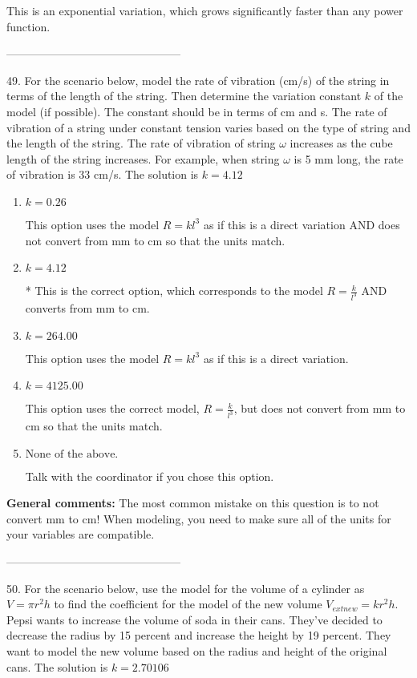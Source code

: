 \documentclass{extbook}[14pt]
\begin{document}
This is an exponential variation, which grows significantly faster than any power function.

-----------------------------------------------

49. For the scenario below, model the rate of vibration (cm/s) of the string in terms of the length of the string. Then determine the variation constant $k$ of the model (if possible). The constant should be in terms of cm and s.
The rate of vibration of a string under constant tension varies based on the type of string and the length of the string. The rate of vibration of string $\omega$ increases as the cube length of the string increases. For example, when string $\omega$ is 5 mm long, the rate of vibration is 33 cm/s. 
The solution is $ k = 4.12 $ 

\begin{enumerate}[label=\Alph*.] 
\item $ k = 0.26 $ 

 This option uses the model $R = kl^{3}$ as if this is a direct variation AND does not convert from mm to cm so that the units match. 
\item $ k = 4.12 $ 

 * This is the correct option, which corresponds to the model $R = \frac{k}{l^{3}}$ AND converts from mm to cm. 
\item $ k = 264.00 $ 

 This option uses the model $R = kl^{3}$ as if this is a direct variation. 
\item $ k = 4125.00 $ 

 This option uses the correct model, $R = \frac{k}{l^{3}}$, but does not convert from mm to cm so that the units match. 
\item $ \text{None of the above.} $ 

 Talk with the coordinator if you chose this option. 
\end{enumerate} 
 
\textbf{General comments:} The most common mistake on this question is to not convert mm to cm! When modeling, you need to make sure all of the units for your variables are compatible.

-----------------------------------------------

50. For the scenario below, use the model for the volume of a cylinder as $V = \pi r^2 h$ to find the coefficient for the model of the new volume $V_{	ext{new}} = k r^2 h$.
Pepsi wants to increase the volume of soda in their cans. They've decided to decrease the radius by 15 percent and increase the height by 19 percent. They want to model the new volume based on the radius and height of the original cans. 
The solution is $ k = 2.70106 $ 
\end{document}
